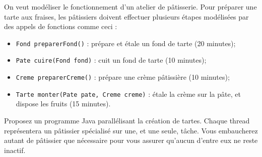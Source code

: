 
\begingroup

\begin{exercice}
  \label{exo:blocking/pipeline}

  On veut modéliser le fonctionnement d'un atelier de pâtisserie.
  Pour préparer une tarte aux fraises, les pâtissiers doivent
  effectuer plusieurs étapes modélisées par des appels de fonctions comme ceci :

  \begin{itemize}
  \item \lstinline{Fond preparerFond()} : prépare et étale un fond de tarte (20 minutes);
  \item \lstinline{Pate cuire(Fond fond)} : cuit un fond de tarte (10 minutes);
  \item \lstinline{Creme preparerCreme()} : prépare une crème pâtissière (10 minutes);
  \item \lstinline{Tarte monter(Pate pate, Creme creme)} : étale la crème sur la pâte, et dispose les fruits (15 minutes).
  \end{itemize}

  \begin{question}
  \item Proposez un programme Java parallélisant la création de tartes.
    Chaque thread représentera un pâtissier spécialisé sur une, et une seule, tâche.
    Vous embaucherez autant de pâtissier que nécessaire pour vous
    assurer qu'aucun d'entre eux ne reste inactif. 
  \end{question}

\end{exercice}

\endgroup
\endinput
